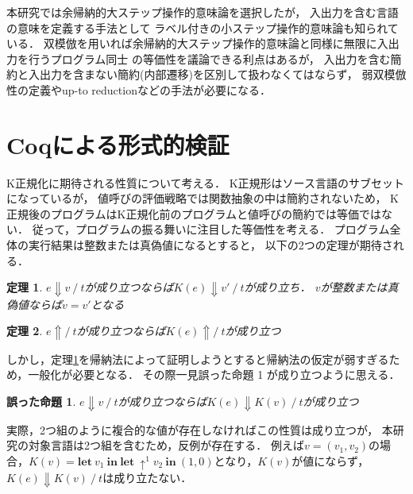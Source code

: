 \documentclass{compsoft}
\newcommand{\keyword}[1]{\mathbf{#1}}
\newcommand{\LET}{\keyword{let}}
\newcommand{\IN}{\keyword{in}}
\newcommand{\theoremname}{定理}
\newtheorem{theorem}{\theoremname}
\newcommand{\wrongpropositioname}{誤った命題}
\newtheorem{wrongproposition}{\wrongpropositioname}
\begin{document}
本研究では余帰納的大ステップ操作的意味論を選択したが，
入出力を含む言語の意味を定義する手法として
ラベル付きの小ステップ操作的意味論も知られている．
双模倣を用いれば余帰納的大ステップ操作的意味論と同様に無限に入出力を行うプログラム同士
の等価性を議論できる利点はあるが，
入出力を含む簡約と入出力を含まない簡約(内部遷移)を区別して扱わなくてはならず，
弱双模倣性の定義やup-to reductionなどの手法が必要になる．

\section{Coqによる形式的検証}\label{section:verification}
K正規化に期待される性質について考える．
K正規形はソース言語のサブセットになっているが，
値呼びの評価戦略では関数抽象の中は簡約されないため，
K正規後のプログラムはK正規化前のプログラムと値呼びの簡約では等価ではない．
従って，プログラムの振る舞いに注目した等価性を考える．
プログラム全体の実行結果は整数または真偽値になるとすると，
以下の2つの定理が期待される．
\begin{theorem}\label{theorem:eval-correctness}
	$e\Downarrow v~/~t$が成り立つならば$K(e)\Downarrow v'~/~t$が成り立ち．
	$v$が整数または真偽値ならば$v=v'$となる
\end{theorem}
\begin{theorem}\label{theorem:diverge-correctness}
	$e\Uparrow/~t$が成り立つならば$K(e)\Uparrow/~t$が成り立つ
\end{theorem}

しかし，\theoremname\ref{theorem:eval-correctness}を帰納法によって証明しようとすると帰納法の仮定が弱すぎるため，一般化が必要となる．
その際一見\wrongpropositioname
1 %
が成り立つように思える．
\begin{wrongproposition}\label{wrongproposition:wrong-lemma}
	$e\Downarrow v~/~t$が成り立つならば$K(e)\Downarrow K(v)~/~t$が成り立つ
\end{wrongproposition}
実際，2つ組のように複合的な値が存在しなければこの性質は成り立つが，
本研究の対象言語は2つ組を含むため，反例が存在する．
例えば$v=(v_1,v_2)$の場合，$K(v)=\LET~v_1~\IN~\LET~\uparrow^1 v_2~\IN~(1,0)$となり，$K(v)$が値にならず，
$K(e)\Downarrow K(v)~/~t$は成り立たない．
\end{document}
